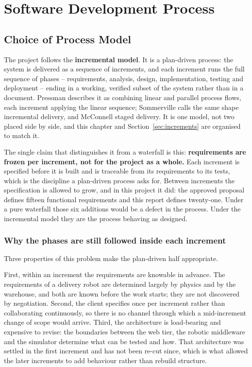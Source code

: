\documentclass[12pt,a4paper]{report}
\begin{document}
\chapter{Software Development Process}
\label{ch:process}

\section{Choice of Process Model}
The project follows the \textbf{incremental model}. It is a plan-driven process: the system is
delivered as a sequence of increments, and each increment runs the full sequence of phases --
requirements, analysis, design, implementation, testing and deployment -- ending in a working,
verified subset of the system rather than in a document. Pressman describes it as combining linear
and parallel process flows, each increment applying the linear sequence; Sommerville calls the same
shape incremental delivery, and McConnell staged delivery. It is one model, not two placed side by
side, and this chapter and Section~\ref{sec:increments} are organised to match it.

The single claim that distinguishes it from a waterfall is this: \textbf{requirements are frozen per
increment, not for the project as a whole.} Each increment is specified before it is built and is
traceable from its requirements to its tests, which is the discipline a plan-driven process asks
for. Between increments the specification is allowed to grow, and in this project it did: the
approved proposal defines fifteen functional requirements and this report defines twenty-one. Under
a pure waterfall those six additions would be a defect in the process. Under the incremental model
they are the process behaving as designed.

\subsection*{Why the phases are still followed inside each increment}
Three properties of this problem make the plan-driven half appropriate.

First, within an increment the requirements are knowable in advance. The requirements of a delivery
robot are determined largely by physics and by the warehouse, and both are known before the work
starts; they are not discovered by negotiation. Second, the client specifies once per increment
rather than collaborating continuously, so there is no channel through which a mid-increment change
of scope would arrive. Third, the architecture is load-bearing and expensive to revise: the
boundaries between the web tier, the robotic middleware and the simulator determine what can be
tested and how. That architecture was settled in the first increment and has not been re-cut since,
which is what allowed the later increments to add behaviour rather than rebuild structure.
\end{document}
